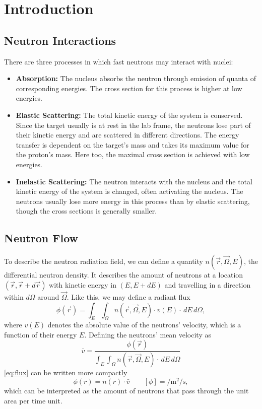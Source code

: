 \chapter{Introduction}
\section{Neutron Interactions}\label{sec:inter}
There are three processes in which fast neutrons may interact with nuclei:
\begin{itemize}
	\item \textbf{Absorption:} The nucleus absorbs the neutron through emission of quanta of corresponding energies.
	The cross section for this process is higher at low energies.
	\item \textbf{Elastic Scattering:} The total kinetic energy of the system is conserved.
	Since the target usually is at rest in the lab frame, the neutrons lose part of their kinetic energy and are scattered in different directions.
	The energy transfer is dependent on the target's mass and takes its maximum value for the proton's mass.
	Here too, the maximal cross section is achieved with low energies.
	\item \textbf{Inelastic Scattering:} The neutron interacts with the nucleus and the total kinetic energy of the system is changed, often activating the nucleus.
	The neutrons usually lose more energy in this process than by elastic scattering, though the cross sections is generally smaller.
\end{itemize}

\section{Neutron Flow}\label{sec:flow}
To describe the neutron radiation field, we can define a quantity $n(\vec{r}, \vec{\Omega}, E)$, the differential neutron density.
It describes the amount of neutrons at a location $(\vec{r}, \vec{r} + d\vec{r})$ with kinetic energy in $(E, E+dE)$ and travelling in a direction within $d\Omega$ around $\vec{\Omega}$.
Like this, we may define a radiant flux
\begin{equation}\label{eq:flux}
	\phi(\vec{r}) = \int_E \int_\Omega n(\vec{r}, \vec{\Omega}, E)\cdot v(E)\cdot \,dE \,d\Omega,
\end{equation}
where $v(E)$ denotes the absolute value of the neutrons' velocity, which is a function of their energy $E$.
Defining the neutrons' mean velocity as
\begin{equation*}
	\bar{v} = \frac{\phi(\vec{r})}{\int_E \int_\Omega n(\vec{r}, \vec{\Omega}, E)\cdot \,dE \,d\Omega}
\end{equation*}
\autoref{eq:flux} can be written more compactly
\begin{equation*}
	\phi(r) = n(r)\cdot \bar{v} \qquad \left[\phi\right]=\si{\per\meter\squared\per\second},
\end{equation*}
which can be interpreted as the amount of neutrons that pass through the unit area per time unit.


